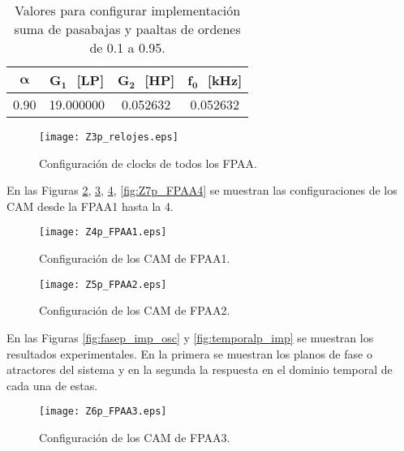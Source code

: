 	\begin{table}[!hbp]                                      
		\centering   
		\caption{Valores para configurar implementación suma de pasabajas y paaltas de ordenes de 0.1 a 0.95.}                            
		\label{tab:repaso2}                                        
			\begin{tabular}{cccc}                        
			\hline                                              
			$\bm{\alpha}$ & $\bm{G_{1}}\,\,$ [LP] & $\bm{G_{2}}\,\,$ [HP] & $\bm{f_{0}}\,\,$ [kHz]  \\            
			\hline                                                                         
			0.90 & 19.000000 & 0.052632 & 0.052632 \\
			\hline                                              
			\end{tabular}                                                                
	\end{table} 	
	
	
	\begin{figure}[!ht] 
		\caption{Configuración de clocks de todos los FPAA.}
		\label{fig:Z3p_relojes}
		\centering
		\texttt{[image: Z3p\_relojes.eps]}
	\end{figure}
	
	En las Figuras \ref{fig:Z4p_FPAA1}, \ref{fig:Z5p_FPAA2}, \ref{fig:Z6p_FPAA3}, \ref{fig:Z7p_FPAA4} se muestran las configuraciones de los CAM desde la FPAA1 hasta la 4.
	\begin{figure}[!ht] 
		\caption{Configuración de los CAM de FPAA1.}
		\label{fig:Z4p_FPAA1}
		\centering
		\texttt{[image: Z4p\_FPAA1.eps]}
	\end{figure}
	
	\begin{figure}[!ht] 
		\caption{Configuración de los CAM de FPAA2.}
		\label{fig:Z5p_FPAA2}
		\centering
		\texttt{[image: Z5p\_FPAA2.eps]}
	\end{figure}
	
	En las Figuras \ref{fig:fasep_imp_osc} y \ref{fig:temporalp_imp} se muestran los resultados experimentales. En la primera se muestran los planos de fase o atractores  del sistema y en la segunda la respuesta en el dominio temporal de cada una de estas.
	\begin{figure}[!ht] 
		\caption{Configuración de los CAM de FPAA3.}
		\label{fig:Z6p_FPAA3}
		\centering
		\texttt{[image: Z6p\_FPAA3.eps]}
	\end{figure}
	
